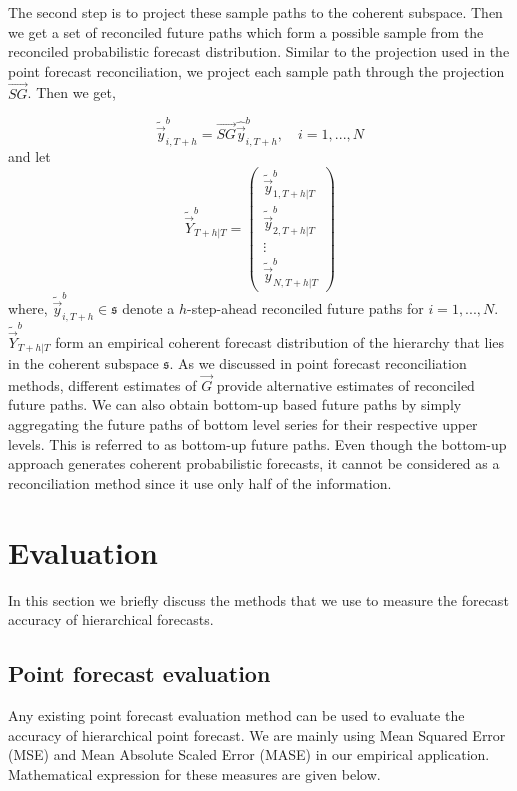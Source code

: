 \documentclass[graybox]{svmult}
\begin{document}
The second step is to project these sample paths to the coherent subspace. Then we get a set of reconciled future paths which form a possible sample from the reconciled probabilistic forecast distribution. Similar to the projection used in the point forecast reconciliation, we project each sample path through the projection $\vec{SG}$. Then we get,

\begin{equation} \label{eq:20}
\tilde{\vec{y}}_{i,T+h}^b = \vec{SG}\hat{\vec{y}}_{i,T+h}^b, \quad i = 1, ..., N
\end{equation}
and let
\begin{equation}\label{eq:21}
\tilde{\vec{Y}}^b_{T+h|T}=\begin{pmatrix}
\tilde{\vec{y}}_{1,T+h|T}^b\\
\tilde{\vec{y}}_{2,T+h|T}^b\\
\vdots\\
\tilde{\vec{y}}_{N,T+h|T}^b
\end{pmatrix}
\end{equation}
where, $\tilde{\vec{y}}_{i,T+h}^b \in \mathfrak{s}$ denote a $h$-step-ahead reconciled future paths for $i=1,...,N$. $\tilde{\vec{Y}}^b_{T+h|T}$ form an empirical coherent forecast distribution of the hierarchy that lies in the coherent subspace $\mathfrak{s}$. As we discussed in point forecast reconciliation methods, different estimates of $\vec{G}$ provide alternative estimates of reconciled future paths. We can also obtain bottom-up based future paths by simply aggregating the future paths of bottom level series for their respective upper levels. This is referred to as bottom-up future paths. Even though the bottom-up approach generates coherent probabilistic forecasts, it cannot be considered as a reconciliation method since it use only half of the information.


\section{Evaluation}

In this section we briefly discuss the methods that we use to measure the forecast accuracy of hierarchical forecasts.

\subsection{Point forecast evaluation}

Any existing point forecast evaluation method can be used to evaluate the accuracy of hierarchical point forecast. We are mainly using Mean Squared Error (MSE) and Mean Absolute Scaled Error (MASE) in our empirical application. Mathematical expression for these measures are given below.
\end{document}
